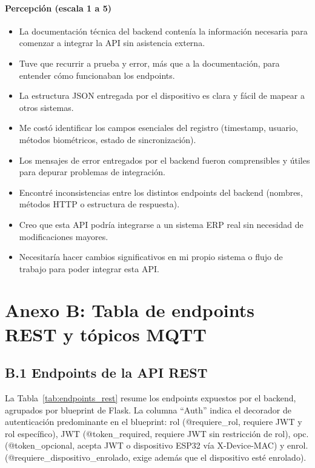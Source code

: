\documentclass{iccmemoria}
\begin{document}
\subsubsection*{Percepción (escala 1 a 5)}
\begin{itemize}
    \item La documentación técnica del backend contenía la información necesaria para comenzar a integrar la API sin asistencia externa.
    \item Tuve que recurrir a prueba y error, más que a la documentación, para entender cómo funcionaban los endpoints.
    \item La estructura JSON entregada por el dispositivo es clara y fácil de mapear a otros sistemas.
    \item Me costó identificar los campos esenciales del registro (timestamp, usuario, métodos biométricos, estado de sincronización).
    \item Los mensajes de error entregados por el backend fueron comprensibles y útiles para depurar problemas de integración.
    \item Encontré inconsistencias entre los distintos endpoints del backend (nombres, métodos HTTP o estructura de respuesta).
    \item Creo que esta API podría integrarse a un sistema ERP real sin necesidad de modificaciones mayores.
    \item Necesitaría hacer cambios significativos en mi propio sistema o flujo de trabajo para poder integrar esta API.
\end{itemize}

\chapter*{Anexo B: Tabla de endpoints REST y tópicos MQTT}

\section*{B.1 Endpoints de la API REST}

La Tabla~\ref{tab:endpoints_rest} resume los endpoints expuestos por el backend, agrupados por blueprint de Flask. La columna ``Auth'' indica el decorador de autenticación predominante en el blueprint: rol (@requiere\_rol, requiere JWT y rol específico), JWT (@token\_required, requiere JWT sin restricción de rol), opc. (@token\_opcional, acepta JWT o dispositivo ESP32 vía X-Device-MAC) y enrol. (@requiere\_dispositivo\_enrolado, exige además que el dispositivo esté enrolado).
\end{document}
